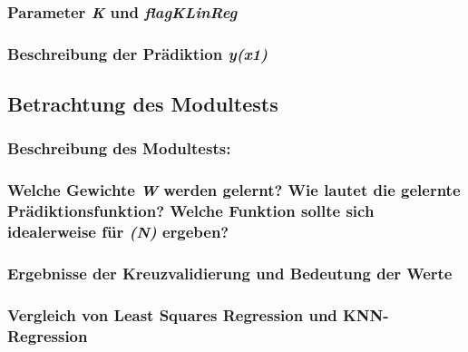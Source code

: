 \subsubsection{ Parameter \textit{K} und \textit{flagKLinReg} }

\subsubsection{ Beschreibung der Prädiktion \textit{y(x1)} }

\subsection{
    Betrachtung des Modultests
}

\subsubsection{ Beschreibung des Modultests: }

\subsubsection{ Welche Gewichte \textit{W} werden gelernt? Wie lautet die gelernte Prädiktionsfunktion? Welche Funktion sollte sich idealerweise für \textit{(N\rightarrow\infty)} ergeben? }

\subsubsection{ Ergebnisse der Kreuzvalidierung und Bedeutung der Werte }

\subsubsection{ Vergleich von Least Squares Regression und KNN-Regression }
